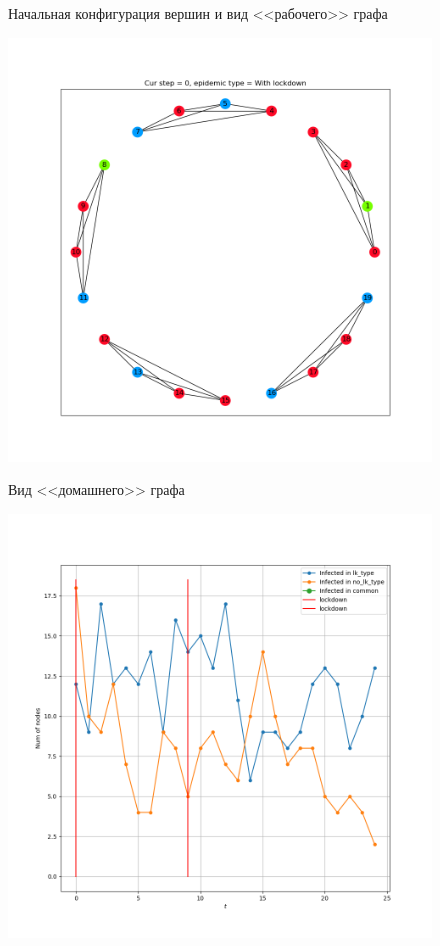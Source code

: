 \begin{figure}[h]
\begin{center}
\begin{minipage}{0.49\linewidth}
				\centering
				Начальная конфигурация вершин и вид <<рабочего>> графа
			\end{minipage}
			\begin{minipage}{0.49\linewidth}
				\includegraphics[width=\linewidth, keepaspectratio]{../figs/evidence3/start_with_ld}
				
				\centering
				Вид <<домашнего>> графа
			\end{minipage}
		\end{center}
		
		\begin{center}
			\begin{minipage}{0.49\linewidth}
				\includegraphics[width=\linewidth, keepaspectratio]{../figs/evidence3/tracks}
				

\end{minipage}
\end{center}
\end{figure}

